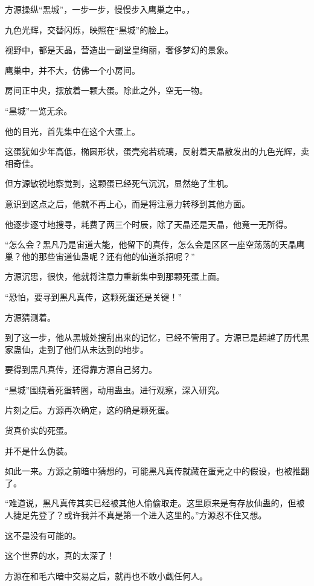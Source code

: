 
\begin{this_body}

方源操纵“黑城”，一步一步，慢慢步入鹰巢之中。，

九色光辉，交替闪烁，映照在“黑城”的脸上。

视野中，都是天晶，营造出一副堂皇绚丽，奢侈梦幻的景象。

鹰巢中，并不大，仿佛一个小房间。

房间正中央，摆放着一颗大蛋。除此之外，空无一物。

“黑城”一览无余。

他的目光，首先集中在这个大蛋上。

这蛋犹如少年高低，椭圆形状，蛋壳宛若琉璃，反射着天晶散发出的九色光辉，卖相奇佳。

但方源敏锐地察觉到，这颗蛋已经死气沉沉，显然绝了生机。

意识到这点之后，他就不再上心，而是将注意力转移到其他方面。

他逐步逐寸地搜寻，耗费了两三个时辰，除了天晶还是天晶，他竟一无所得。

“怎么会？黑凡乃是宙道大能，他留下的真传，怎么会是区区一座空荡荡的天晶鹰巢？他的那些宙道仙蛊呢？还有他的仙道杀招呢？”

方源沉思，很快，他就将注意力重新集中到那颗死蛋上面。

“恐怕，要寻到黑凡真传，这颗死蛋还是关键！”

方源猜测着。

到了这一步，他从黑城处搜刮出来的记忆，已经不管用了。方源已是超越了历代黑家蛊仙，走到了他们从未达到的地步。

要得到黑凡真传，还得靠方源自己努力。

“黑城”围绕着死蛋转圈，动用蛊虫。进行观察，深入研究。

片刻之后。方源再次确定，这的确是颗死蛋。

货真价实的死蛋。

并不是什么伪装。

如此一来。方源之前暗中猜想的，可能黑凡真传就藏在蛋壳之中的假设，也被推翻了。

“难道说，黑凡真传其实已经被其他人偷偷取走。这里原来是有存放仙蛊的，但被人捷足先登了？或许我并不真是第一个进入这里的。”方源忍不住又想。

这不是没有可能的。

这个世界的水，真的太深了！

方源在和毛六暗中交易之后，就再也不敢小觑任何人。


\end{this_body}

